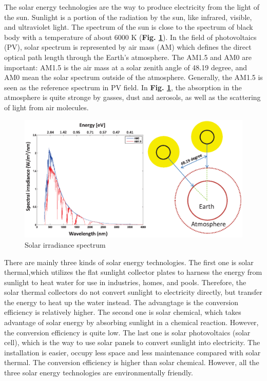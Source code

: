 \documentclass[a4paper, 12pt, titlepage,oneside,drop]{kthesis}
\begin{document}
The solar energy technologies are the way to produce electricity from the light of the sun. Sunlight is a portion of the radiation by the sun, like infrared, visible,
and ultraviolet light. The spectrum of the sun is close to the spectrum of black body with a temperature of about 6000 K (\textbf{Fig. \ref{spectrumsun}}). In the field of photovoltaics (PV), solar spectrum is represented
by air mass (AM) which defines the direct optical path length through the Earth's atmosphere. The AM1.5 and AM0 are important: AM1.5 is the air mass at a solar zenith angle of 48.19 degree, and AM0 mean the solar spectrum 
outside of the atmosphere. Generally, the AM1.5 is seen as the reference spectrum in PV field. In \textbf{Fig. \ref{spectrumsun}}, the absorption in the atmosphere is quite stronge by gasses, dust and aerosols, as well as
the scattering of light from air molecules. 

\begin{figure}[H]
\centering
\includegraphics[scale=0.6]{spectrum.eps}
\caption{Solar irradiance spectrum}
\label{spectrumsun}
\end{figure}

There are mainly three kinds of solar energy technologies. The first one is solar thermal,which utilizes the flat sunlight collector plates to harness the energy from sunlight to heat water for use in industries, homes, and pools.
Therefore, the solar thermal collectors do not convert sunlight to electricity directly, but transfer the energy to heat up the water instead. The advangtage is the conversion efficiency is relatively higher. The second one is 
solar chemical, which takes advantage of solar energy by absorbing sunlight in a chemical reaction. However, the conversion efficiency is quite low. The last one is solar photovoltaics (solar cell), which is the way
to use solar panels to convert sunlight into electricity. The installation is easier, occupy less space and less maintenance compared with solar thermal. The conversion efficiency is higher than solar chemical. However, 
all the three solar energy technologies are environmentally friendly.
\end{document}
